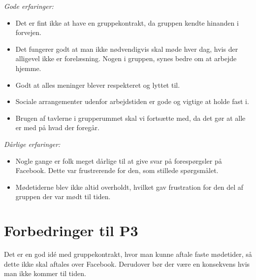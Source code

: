 \emph{Gode erfaringer:}
\begin{itemize}

\item	Det er fint ikke at have en gruppekontrakt, da gruppen kendte hinanden i forvejen.

\item	Det fungerer godt at man ikke nødvendigvis skal møde hver dag, hvis der alligevel ikke er forelæsning. Nogen i gruppen, synes bedre om at arbejde hjemme.  

\item	Godt at alles meninger blever respekteret og lyttet til.

\item	Sociale arrangementer udenfor arbejdstiden er gode og vigtige at holde fast i.

\item	 Brugen af tavlerne i grupperummet skal vi fortsætte med, da det gør at alle er med på hvad der foregår. 
\end{itemize}\emph{Dårlige erfaringer:}
\begin{itemize}

\item	 Nogle gange er folk meget dårlige til at give svar på forespørgsler på Facebook. Dette var frustrerende for den, som stillede spørgsmålet.

\item	Mødetiderne blev ikke altid overholdt, hvilket gav frustration for den del af gruppen der var mødt til tiden.
\end{itemize}

\section{Forbedringer til P3}
Det er en god idé med gruppekontrakt, hvor man kunne aftale faste mødetider, så dette ikke skal aftales over Facebook. Derudover bør der være en konsekvens hvis man ikke kommer til tiden.
